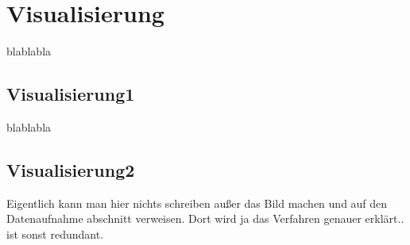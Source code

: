 \section{Visualisierung} %
\label{sec:Visualisierung}
blablabla

\subsection{Visualisierung1} %
\label{sub:Visualisierung1}
blablabla


\subsection{Visualisierung2} %
\label{sub:Visualisierung2}
Eigentlich kann man hier nichts schreiben außer das Bild machen und auf den Datenaufnahme abschnitt verweisen. Dort wird ja das Verfahren genauer erklärt.. ist sonst redundant.


